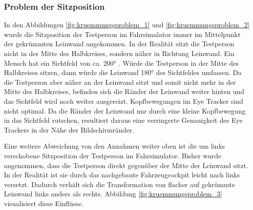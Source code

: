 \subsubsection{Problem der Sitzposition}

In den Abbildungen \ref{fig:kruemmungsproblem_1} und \ref{fig:kruemmungsproblem_2} wurde die Sitzposition der Testperson im Fahrsimulator immer im Mittelpunkt der gekrümmten Leinwand angekommen. In der Realität sitzt die Testperson nicht in der Mitte des Halbkreises, sondern näher in Richtung Leinwand. Ein Mensch hat ein Sichtfeld von ca. 200° \cite{lit_website_doccheck_fov}. Würde die Testperson in der Mitte des Halbkreises sitzen, dann würde die Leinwand 180° des Sichtfeldes umfassen. Da die Testperson aber näher an der Leinwand sitzt und somit nicht mehr in der Mitte des Halbkreises, befinden sich die Ränder der Leinwand weiter hinten und das Sichtfeld wird noch weiter ausgereizt. Kopfbewegungen im Eye Tracker sind nicht optimal. Da die Ränder der Leinwand nur durch eine kleine Kopfbewegung in das Sichtfeld rutschen, resultiert daraus eine verringerte Genauigkeit des Eye Trackers in der Nähe der Bildschirmränder.

Eine weitere Abweichung von den Annahmen weiter oben ist die um links verschobene Sitzposition der Testperson im Fahrsimulator. Bisher wurde angenommen, dass die Testperson direkt gegenüber der Mitte der Leinwand sitzt. In der Realität ist sie durch das nachgebaute Fahrzeugcockpit leicht nach links versetzt. Dadurch verhält sich die Transformation von flacher auf gekrümmte Leinwand links anders als rechts. Abbildung \ref{fig:kruemmungsproblem_3} visualisiert diese Einflüsse. 


